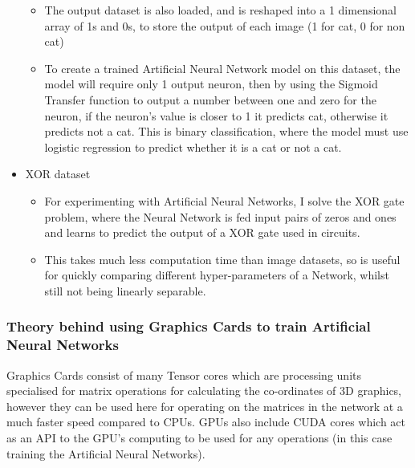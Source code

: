 \documentclass[./project-report/src/latex/project-report.tex]{subfiles}
\begin{document}
\begin{itemize}
\begin{itemize}
        \item The output dataset is also loaded, and is reshaped into a 1 dimensional array of 1s and 0s, to store the output of each image (1 for cat, 0 for non cat)
        \item To create a trained Artificial Neural Network model on this dataset, the model will require only 1 output neuron, then by using the Sigmoid Transfer 
              function to output a number between one and zero for the neuron, if the neuron's value is closer to 1 it predicts cat, otherwise it predicts not a cat. 
              This is binary classification, where the model must use logistic regression to predict whether it is a cat or not a cat.
    \end{itemize}
    \item XOR dataset
    \begin{itemize}
        \item For experimenting with Artificial Neural Networks, I solve the XOR gate problem, where the Neural Network is fed input pairs of zeros and ones and learns 
              to predict the output of a XOR gate used in circuits.
        \item This takes much less computation time than image datasets, so is useful for quickly comparing different hyper-parameters of a Network, whilst still 
              not being linearly separable.
    \end{itemize}
\end{itemize}

\subsubsection{Theory behind using Graphics Cards to train Artificial Neural Networks}
\vspace{5mm}

Graphics Cards consist of many Tensor cores which are processing units specialised for matrix operations for calculating the co-ordinates of 3D graphics, however they 
can be used here for operating on the matrices in the network at a much faster speed compared to CPUs. GPUs also include CUDA cores which act as an API to the GPU's 
computing to be used for any operations (in this case training the Artificial Neural Networks).

\pagebreak
\end{document}
